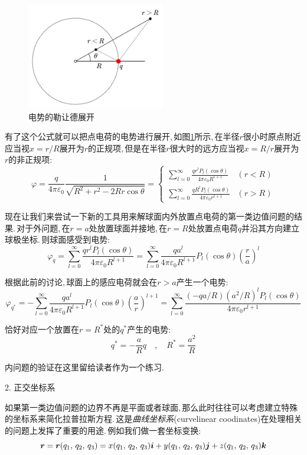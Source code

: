 \begin{figure}
	\vspace{-0.6cm}
	\centering
	\includegraphics[width=6cm]{image/7-2-15.png}
	\caption{电势的勒让德展开}\label{fig:7-2-15}
\end{figure}
有了这个公式就可以把点电荷的电势进行展开,\,如图\ref{fig:7-2-15}所示,\,在半径$r$很小时原点附近应当视$x=r/R$展开为$r$的正规项,\,但是在半径$r$很大时的远方应当视$x=R/r$展开为$r$的非正规项:
\[\varphi=\frac{q}{4\pi\varepsilon_0}\frac{1}{\sqrt{R^2+r^2-2Rr\cos\theta}}=\begin{cases}
\displaystyle\sum_{l=0}^\infty \frac{qr^lP_l(\cos\theta)}{4\pi\varepsilon_0R^{l+1}}&(r<R)\\
\displaystyle\sum_{l=0}^\infty \frac{qR^lP_l(\cos\theta)}{4\pi\varepsilon_0r^{l+1}}&(r>R)
\end{cases}\]

\vspace{0.5cm}
现在让我们来尝试一下新的工具用来解球面内外放置点电荷的第一类边值问题的结果.\,对于外问题,\,在$r=a$处放置球面并接地,\,在$r=R$处放置点电荷$q$并沿其方向建立球极坐标.\,则球面感受到电势:
\[\varphi_q=\sum_{l=0}^\infty \frac{qr^lP_l(\cos\theta)}{4\pi\varepsilon_0R^{l+1}}=\sum_{l=0}^\infty \frac{qa^l}{4\pi\varepsilon_0R^{l+1}}P_l(\cos\theta)\left(\frac{r}{a}\right)^l\]

根据此前的讨论,\,球面上的感应电荷就会在$r>a$产生一个电势:
\[\varphi_{q^*}=-\sum_{l=0}^\infty \frac{qa^l}{4\pi\varepsilon_0R^{l+1}}P_l(\cos\theta)\left(\frac{a}{r}\right)^{l+1}=\sum_{l=0}^\infty \frac{(-qa/R)(a^2/R)^lP_l(\cos\theta)}{4\pi\varepsilon_0r^{l+1}}\]

恰好对应一个放置在$r=R^*$处的$q^*$产生的电势:
\[q^*=-\frac{a}{R}q\quad ,\quad R^*=\frac{a^2}{R}\]

内问题的验证在这里留给读者作为一个练习.

\vspace{1.2cm}
2. 正交坐标系
\vspace{0.2cm}

如果第一类边值问题的边界不再是平面或者球面,\,那么此时往往可以考虑建立特殊的坐标系来简化拉普拉斯方程.\,这是\emph{曲线坐标系}(curvelinear coodinates)在处理相关的问题上发挥了重要的用途.\,例如我们做一套坐标变换:
\[\boldsymbol{r}=\boldsymbol{r}(q_1,\,q_2,\,q_3)=x(q_1,\,q_2,\,q_3)\boldsymbol{i}+y(q_1,\,q_2,\,q_3)\boldsymbol{j}+z(q_1,\,q_2,\,q_3)\boldsymbol{k}\]

